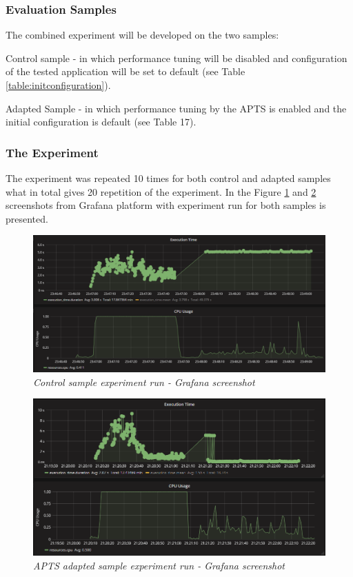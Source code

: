 \documentclass[12pt,a4paper]{article}
\let\tempone\itemize
\let\temptwo\enditemize
\renewenvironment{itemize}{\tempone\addtolength{\itemsep}{-0.4\baselineskip}}{\temptwo}
\begin{document}
\subsubsection{Evaluation Samples} 

The combined experiment will be developed on the two samples:
\begin{itemize}
\item Control sample - in which performance tuning will be disabled and configuration of the tested application will be set to default (see Table \ref{table:initconfiguration}). 
\item Adapted Sample - in which performance tuning by the APTS is enabled and the initial
configuration is default (see Table 17). 
\end{itemize}

\subsubsection{The Experiment} 

The experiment was repeated 10 times for both control and adapted samples what in total gives 20 repetition of the experiment. In the Figure \ref{figure:combined:screen:control} and \ref{figure:combined:screen:adapted} screenshots from Grafana platform with experiment run for both samples is presented.

\begin{figure}[!htb]
\centering
\includegraphics[width=1\textwidth]{combinedCtrl}
\caption{\textit{Control sample experiment run - Grafana screenshot}} \label{figure:combined:screen:control}
\end{figure}
\begin{figure}[!htb]
\centering
\includegraphics[width=1\textwidth]{combinedEval}
\caption{\textit{APTS adapted sample experiment run - Grafana screenshot}} \label{figure:combined:screen:adapted}
\end{figure}
\end{document}

